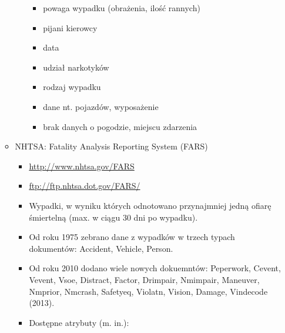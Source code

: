 \begin{enumerate}
\begin{itemize}
\begin{itemize}
      \begin{itemize}
      \itemsep1pt\parskip0pt
      \item
        powaga wypadku (obrażenia, ilość rannych)\\
      \item
        pijani kierowcy\\
      \item
        data\\
      \item
        udział narkotyków\\
      \item
        rodzaj wypadku\\
      \item
        dane nt. pojazdów, wyposażenie\\
      \item
        brak danych o pogodzie, miejscu zdarzenia\\
      \end{itemize}
    \end{itemize}
  \item
    NHTSA: Fatality Analysis Reporting System (FARS)

    \begin{itemize}
    \item
      \url{http://www.nhtsa.gov/FARS}\\
    \item
      \url{ftp://ftp.nhtsa.dot.gov/FARS/}\\
    \item
      Wypadki, w wyniku których odnotowano przynajmniej jedną ofiarę
      śmiertelną (max. w ciągu 30 dni po wypadku).\\
    \item
      Od roku 1975 zebrano dane z wypadków w trzech typach dokumentów:
      Accident, Vehicle, Person.\\
    \item
      Od roku 2010 dodano wiele nowych dokuemntów: Peperwork, Cevent,
      Vevent, Vsoe, Distract, Factor, Drimpair, Nmimpair, Maneuver,
      Nmprior, Nmcrash, Safetyeq, Violatn, Vision, Damage, Vindecode
      (2013).\\
    \item
      Dostępne atrybuty (m. in.):


\end{itemize}
\end{itemize}
\end{enumerate}
